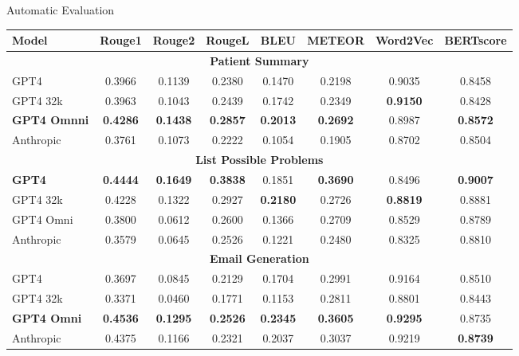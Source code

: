 \documentclass[usenames,dvipsnames]{beamer}
\begin{document}
\begin{frame}[shrink=32]{Automatic Evaluation}
  
  \vspace{10mm}
  \centering
  \begin{threeparttable}[c]
    \setlength{\extrarowheight}{2pt}
    \begin{tabular}{|l|c|c|c|c|c|c|c|}
    \hline
    Model & Rouge1 & Rouge2 & RougeL & BLEU & METEOR & Word2Vec & BERTscore \\
    \hline
    \multicolumn{8}{|c|}{\textbf{Patient Summary}} \\
    \hline
    GPT4      & 0.3966 & 0.1139 & 0.2380 & 0.1470 & 0.2198 & 0.9035 & 0.8458 \\
    GPT4 32k  & 0.3963 & 0.1043 & 0.2439 & 0.1742 & 0.2349 & \textbf{0.9150} & 0.8428 \\
    \textbf{GPT4 Omnni}     & \textbf{0.4286} & \textbf{0.1438} & \textbf{0.2857} & \textbf{0.2013} & \textbf{0.2692} & 0.8987 & \textbf{0.8572} \\
    Anthropic & 0.3761 & 0.1073 & 0.2222 & 0.1054 & 0.1905 & 0.8702 & 0.8504 \\
    \hline
    \multicolumn{8}{|c|}{\textbf{List Possible Problems}} \\
    \hline
    \textbf{GPT4}      & \textbf{0.4444} & \textbf{0.1649} & \textbf{0.3838} & 0.1851 & \textbf{0.3690} & 0.8496 & \textbf{0.9007} \\
    GPT4 32k  & 0.4228 & 0.1322 & 0.2927 & \textbf{0.2180} & 0.2726 & \textbf{0.8819} & 0.8881 \\
    GPT4 Omni     & 0.3800 & 0.0612 & 0.2600 & 0.1366 & 0.2709 & 0.8529 & 0.8789 \\
    Anthropic & 0.3579 & 0.0645 & 0.2526 & 0.1221 & 0.2480 & 0.8325 & 0.8810 \\
    \hline
    \multicolumn{8}{|c|}{\textbf{Email Generation}} \\
    \hline
    GPT4      & 0.3697 & 0.0845 & 0.2129 & 0.1704 & 0.2991 & 0.9164 & 0.8510 \\
    GPT4 32k  & 0.3371 & 0.0460 & 0.1771 & 0.1153 & 0.2811 & 0.8801 & 0.8443 \\
    \textbf{GPT4 Omni}     & \textbf{0.4536} & \textbf{0.1295} & \textbf{0.2526} & \textbf{0.2345} & \textbf{0.3605} & \textbf{0.9295} & 0.8735 \\
    Anthropic & 0.4375 & 0.1166 & 0.2321 & 0.2037 & 0.3037 & 0.9219 & \textbf{0.8739} \\
    \hline
    \end{tabular}
  \end{threeparttable}
\end{frame}
\end{document}
